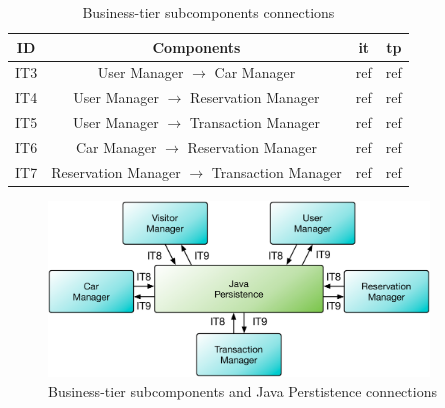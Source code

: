 \begin{table}[htbp]
\begin{center}
\begin{tabular}[t]{cccc}

\hline
\textbf{ID} & \textbf{Components} & \textbf{\acs{it}} & \textbf{\acs{tp}}\\
\hline
IT3 & \enspace User Manager $\rightarrow$ Car Manager \enspace & ref & ref\\
\hline
IT4 & \enspace User Manager $\rightarrow$ Reservation Manager \enspace & ref & ref\\
\hline
IT5 & \enspace User Manager $\rightarrow$ Transaction Manager \enspace & ref & ref\\
\hline
IT6 & \enspace Car Manager $\rightarrow$ Reservation Manager \enspace & ref & ref\\
\hline
IT7 & \enspace Reservation Manager $\rightarrow$ Transaction Manager \enspace & ref & ref\\
\hline


\end{tabular}
\caption{Business-tier subcomponents connections}
\end{center}
\end{table}

\clearpage

\begin{figure}[htbp]
\centering
\includegraphics[width=0.9\textwidth]{Images/IT8-9-.pdf}
\vspace{16pt}
\caption{Business-tier subcomponents and Java Perstistence connections}
\label{fig:it8-9}
\end{figure}

